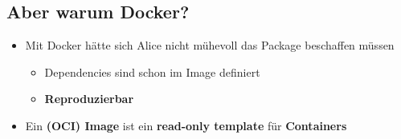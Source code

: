 \subsection{Aber warum Docker?}\label{subsec:aber-warum-docker?}
\begin{frame}
    \slidehead
    \vspace{-1em}
    \Large
    \begin{itemize}
        [<+->]
        \item Mit Docker hätte sich Alice nicht mühevoll das Package beschaffen müssen
        \begin{itemize}
            \item Dependencies sind schon im Image definiert
            \item \textbf{Reproduzierbar}
        \end{itemize}
        \item Ein \textbf{(OCI) Image} ist ein \textbf{read-only template} für \textbf{Containers}
    \end{itemize}
\end{frame}
